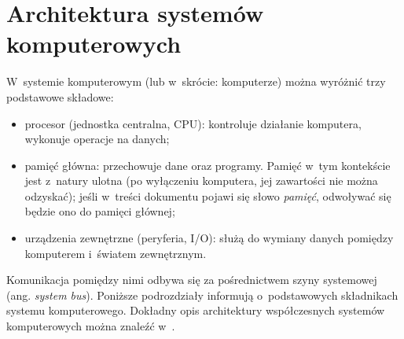 \documentclass[11pt,makeidx]{mwart}
\begin{document}
\section{Architektura systemów komputerowych}
%
\label{sec:architecture}
\indent 
	W~systemie komputerowym (lub w~skrócie: komputerze) można wyróżnić trzy podstawowe składowe:
	\begin{itemize}
		\item procesor (jednostka centralna, CPU): kontroluje działanie komputera, wykonuje operacje na danych;
		\item pamięć główna: przechowuje dane oraz programy. Pamięć w~tym kontekście jest z~natury ulotna (po wyłączeniu komputera,
			jej zawartości nie można odzyskać); jeśli w~treści dokumentu pojawi się słowo \emph{pamięć}, odwoływać się będzie ono do
			pamięci głównej;
		\item urządzenia zewnętrzne (peryferia, I/O): służą do wymiany danych pomiędzy komputerem i~światem zewnętrznym.
	\end{itemize}
	Komunikacja pomiędzy nimi odbywa się za pośrednictwem szyny systemowej (ang. \emph{system bus}).
	Poniższe podrozdziały informują o~podstawowych składnikach systemu komputerowego. Dokładny opis architektury współczesnych
	systemów komputerowych można znaleźć w~\cite{hennessy}.
\par
%
\end{document}
